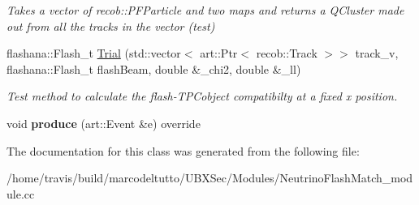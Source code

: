 \begin{DoxyCompactItemize}
\begin{DoxyCompactList}\small\item\em Takes a vector of recob\-::\-P\-F\-Particle and two maps and returns a Q\-Cluster made out from all the tracks in the vector (test) \end{DoxyCompactList}\item 
\hypertarget{classNeutrinoFlashMatch_aa957152a8c232e4b23cc7544aa6bfdd1}{flashana\-::\-Flash\-\_\-t \hyperlink{classNeutrinoFlashMatch_aa957152a8c232e4b23cc7544aa6bfdd1}{Trial} (std\-::vector$<$ art\-::\-Ptr$<$ recob\-::\-Track $>$$>$ track\-\_\-v, flashana\-::\-Flash\-\_\-t flash\-Beam, double \&\-\_\-chi2, double \&\-\_\-ll)}\label{classNeutrinoFlashMatch_aa957152a8c232e4b23cc7544aa6bfdd1}

\begin{DoxyCompactList}\small\item\em Test method to calculate the flash-\/\-T\-P\-Cobject compatibilty at a fixed x position. \end{DoxyCompactList}\item 
\hypertarget{classNeutrinoFlashMatch_a00578af5672ff925f80c1b9482c8b4ff}{void {\bfseries produce} (art\-::\-Event \&e) override}\label{classNeutrinoFlashMatch_a00578af5672ff925f80c1b9482c8b4ff}

\end{DoxyCompactItemize}


The documentation for this class was generated from the following file\-:\begin{DoxyCompactItemize}
\item 
/home/travis/build/marcodeltutto/\-U\-B\-X\-Sec/\-Modules/Neutrino\-Flash\-Match\-\_\-module.\-cc\end{DoxyCompactItemize}
